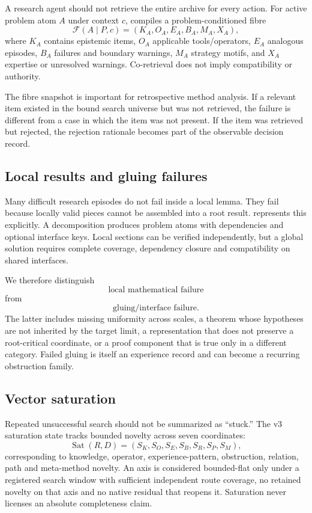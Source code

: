 A research agent should not retrieve the entire archive for every action. For active problem atom $A$ under context $c$, \RAKL{} compiles a problem-conditioned fibre
\[
\mathcal F(A\mid P,c)=
(K_A,O_A,E_A,B_A,M_A,X_A),
\]
where $K_A$ contains epistemic items, $O_A$ applicable tools/operators, $E_A$ analogous episodes, $B_A$ failures and boundary warnings, $M_A$ strategy motifs, and $X_A$ expertise or unresolved warnings. Co-retrieval does not imply compatibility or authority.

The fibre snapshot is important for retrospective method analysis. If a relevant item existed in the bound search universe but was not retrieved, the failure is different from a case in which the item was not present. If the item was retrieved but rejected, the rejection rationale becomes part of the observable decision record.

\subsection{Local results and gluing failures}

Many difficult research episodes do not fail inside a local lemma. They fail because locally valid pieces cannot be assembled into a root result. \RAKL{} represents this explicitly. A decomposition produces problem atoms with dependencies and optional interface keys. Local sections can be verified independently, but a global solution requires complete coverage, dependency closure and compatibility on shared interfaces.

We therefore distinguish
\[
\text{local mathematical failure}
\]
from
\[
\text{gluing/interface failure}.
\]
The latter includes missing uniformity across scales, a theorem whose hypotheses are not inherited by the target limit, a representation that does not preserve a root-critical coordinate, or a proof component that is true only in a different category. Failed gluing is itself an experience record and can become a recurring obstruction family.

\subsection{Vector saturation}

Repeated unsuccessful search should not be summarized as ``stuck.'' The v3 saturation state tracks bounded novelty across seven coordinates:
\[
\operatorname{Sat}(R,D)=
(S_K,S_O,S_E,S_B,S_R,S_P,S_M),
\]
corresponding to knowledge, operator, experience-pattern, obstruction, relation, path and meta-method novelty. An axis is considered bounded-flat only under a registered search window with sufficient independent route coverage, no retained novelty on that axis and no native residual that reopens it. Saturation never licenses an absolute completeness claim.

